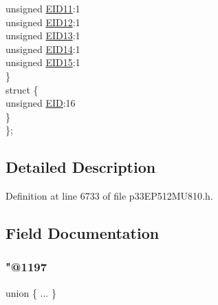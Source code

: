 \begin{DoxyCompactItemize}
\begin{tabbing}
\>\>unsigned \hyperlink{structtag_c2_r_x_f9_e_i_d_b_i_t_s_a710bdb0d602deb021b0be99066008018}{EID11}:1\\
\>\>unsigned \hyperlink{structtag_c2_r_x_f9_e_i_d_b_i_t_s_aa347bb85867bd8d4e0124f7cff8c6472}{EID12}:1\\
\>\>unsigned \hyperlink{structtag_c2_r_x_f9_e_i_d_b_i_t_s_a37d5f3edcbf6ef62f848fd4f3c584f79}{EID13}:1\\
\>\>unsigned \hyperlink{structtag_c2_r_x_f9_e_i_d_b_i_t_s_a7ffc0b0e0d99b8476b6f9a45337c17ab}{EID14}:1\\
\>\>unsigned \hyperlink{structtag_c2_r_x_f9_e_i_d_b_i_t_s_a293cd7dc1746257fa75a60cbd9383cd7}{EID15}:1\\
\>\} \\
\>struct \{\\
\>\>unsigned \hyperlink{structtag_c2_r_x_f9_e_i_d_b_i_t_s_ae80b378c9141f7c03e0b4e55b5f4b54d}{EID}:16\\
\>\} \\
\}; \\

\end{tabbing}\end{DoxyCompactItemize}


\subsection{Detailed Description}


Definition at line 6733 of file p33\+E\+P512\+M\+U810.\+h.



\subsection{Field Documentation}
\mbox{\label{structtag_c2_r_x_f9_e_i_d_b_i_t_s_a04eaf45c283c65883595dc38aaff3431}} 
\subsubsection{\texorpdfstring{"@1197}{@1197}}
{\footnotesize\ttfamily union \{ ... \} }

\mbox{\label{structtag_c2_r_x_f9_e_i_d_b_i_t_s_ae80b378c9141f7c03e0b4e55b5f4b54d}} 
